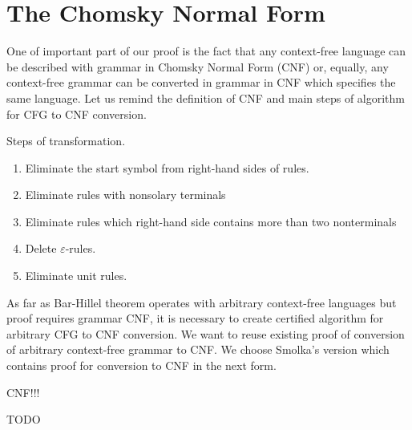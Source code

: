 \section{The Chomsky Normal Form}

One of important part of our proof is the fact that any context-free language can be described with grammar in Chomsky Normal Form (CNF) or, equally, any context-free grammar can be converted in grammar in CNF which specifies the same language.
Let us remind the definition of CNF and main steps of algorithm for CFG to CNF conversion.

Steps of transformation.
\begin{enumerate}
\item Eliminate the start symbol from right-hand sides of rules.
\item Eliminate rules with nonsolary terminals
\item Eliminate rules which right-hand side contains more than two nonterminals
\item Delete $\varepsilon$-rules.
\item Eliminate unit rules.
\end{enumerate}

As far as Bar-Hillel theorem operates with arbitrary context-free languages but proof requires grammar CNF, it is necessary to create certified algorithm for arbitrary CFG to CNF conversion.
We want to reuse existing proof of conversion of arbitrary context-free grammar to CNF.
We choose Smolka's version which contains proof for conversion to CNF in the next form.
\begin{listing}[h]
    \begin{pyglist}[language=coq, numbers=none, numbersep=5pt]
  CNF!!!
    \end{pyglist}
    \caption{TODO}
    \label{lst:verbments1}
\end{listing}



